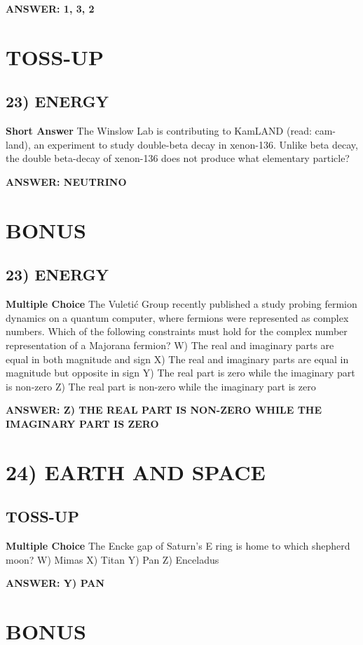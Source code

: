 \documentclass{article}
\begin{document}
\textbf{ANSWER: 1, 3, 2}

\section*{TOSS-UP}
\subsection*{23) ENERGY}
\textbf{Short Answer} The Winslow Lab is contributing to KamLAND (read: cam-land), an experiment to study double-beta decay in xenon-136.
Unlike beta decay, the double beta-decay of xenon-136 does not produce what elementary particle?

\textbf{ANSWER: NEUTRINO}

\section*{BONUS}
\subsection*{23) ENERGY}
\textbf{Multiple Choice} The Vuletić Group recently published a study probing fermion dynamics on a quantum computer, where fermions were represented as complex numbers.
Which of the following constraints must hold for the complex number representation of a Majorana fermion?
W) The real and imaginary parts are equal in both magnitude and sign
X) The real and imaginary parts are equal in magnitude but opposite in sign
Y) The real part is zero while the imaginary part is non-zero
Z) The real part is non-zero while the imaginary part is zero

\textbf{ANSWER: Z) THE REAL PART IS NON-ZERO WHILE THE IMAGINARY PART IS ZERO}

\section*{24) EARTH AND SPACE}
\subsection*{TOSS-UP}
\textbf{Multiple Choice} The Encke gap of Saturn's E ring is home to which shepherd moon?
W) Mimas
X) Titan
Y) Pan
Z) Enceladus

\textbf{ANSWER: Y) PAN}

\section*{BONUS}
\end{document}
